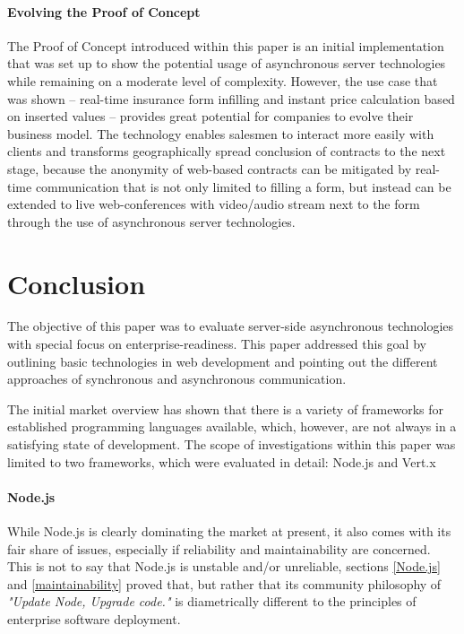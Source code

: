 \paragraph{Evolving the Proof of Concept} The Proof of Concept introduced within this paper is an initial implementation that was set up to show the potential usage of asynchronous server technologies while remaining on a moderate level of complexity. However, the use case that was shown -- real-time insurance form infilling and instant price calculation based on inserted values -- provides great potential for companies to evolve their business model. The technology enables salesmen to interact more easily with clients and transforms geographically spread conclusion of contracts to the next stage, because the anonymity of web-based contracts can be mitigated by real-time communication that is not only limited to filling a form, but instead can be extended to live web-conferences with video/audio stream next to the form through the use of asynchronous server technologies. 

\newpage
\section{Conclusion}
\label{conclusion}

The objective of this paper was to evaluate server-side asynchronous technologies with special focus on enterprise-readiness. This paper addressed this goal by outlining basic technologies in web development and pointing out the different approaches of synchronous and asynchronous communication.

The initial market overview has shown that there is a variety of frameworks for established programming languages available, which, however, are not always in a satisfying state of development. The scope of investigations within this paper was limited to two frameworks, which were evaluated in detail: Node.js and Vert.x\\

\paragraph{Node.js} While Node.js is clearly dominating the market at present, it also comes with its fair share of issues, especially if reliability and maintainability are concerned. This is not to say that Node.js is unstable and/or unreliable, sections \ref{Node.js} and \ref{maintainability} proved that, but rather that its community philosophy of \textit{"Update Node, Upgrade code."} is diametrically different to the principles of enterprise software deployment.\\

